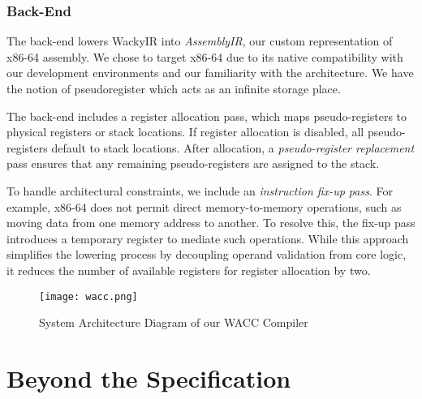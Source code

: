 \documentclass[11pt,a4paper]{article}
\begin{document}
\subsubsection{Back-End}

The back-end lowers WackyIR into \textit{AssemblyIR}, our custom representation of x86-64 assembly. We chose to target x86-64 due to its native compatibility with our development environments and our familiarity with the architecture. We have the notion of pseudoregister which acts as an infinite storage place.

The back-end includes a register allocation pass, which maps pseudo-registers to physical registers or stack locations. If register allocation is disabled, all pseudo-registers default to stack locations. After allocation, a \textit{pseudo-register replacement} pass ensures that any remaining pseudo-registers are assigned to the stack.

To handle architectural constraints, we include an \textit{instruction fix-up pass}. For example, x86-64 does not permit direct memory-to-memory operations, such as moving data from one memory address to another. To resolve this, the fix-up pass introduces a temporary register to mediate such operations. While this approach simplifies the lowering process by decoupling operand validation from core logic, it reduces the number of available registers for register allocation by two.

\begin{figure}[h!]
  \centering
  \texttt{[image: wacc.png]}
  \caption{System Architecture Diagram of our WACC Compiler}
  \label{fig:architecture}
\end{figure}

\section{Beyond the Specification}
\end{document}
